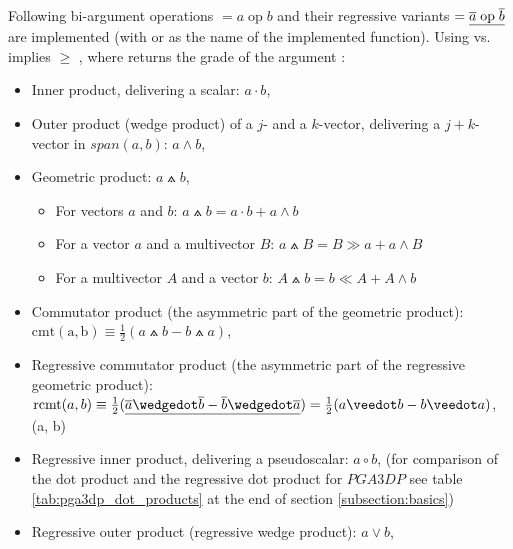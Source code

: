 Following bi-argument operations  $ =a \; \mathrm{op} \; b$ and their
regressive variants  $ = \underline{\overline{a} \; \mathrm{op} \; \overline{b}}$ are
implemented (with  or  as the name of the implemented
function). Using  vs.  implies  $\ge$ , where
 returns the grade of the argument :
\begin{itemize}
    \item Inner product, delivering a scalar: $a \cdot b$, 
    
    \item Outer product (wedge product) of a $j$- and a $k$-vector, delivering a
    $j+k$-vector in $span(a,b)$: $a \wedge b$, 
    
    \item Geometric product:  $a \wedgedot b$, 
    \begin{itemize}
        \item For vectors $a$ and $b$:  $a \wedgedot b = a \cdot b + a \wedge b$
        \item For a vector $a$ and a multivector $B$:
        $a \wedgedot B = B \gg a + a \wedge B$
                \item For a multivector $A$ and a vector $b$:
        $A \wedgedot b = b \ll A + A \wedge b$
    \end{itemize}

    \item Commutator product (the asymmetric part of the geometric product):
    $\mathrm{cmt(a, b)} \equiv \frac{1}{2}(a \wedgedot b - b \wedgedot a)$, 
    
    \item Regressive commutator product (the asymmetric part of the regressive geometric
    product): \\
    $\mathrm{rcmt}(a, b) \equiv \frac{1}{2}(\lcmpl{\rcmpl{a} \wedgedot \rcmpl{b} -
    \rcmpl{b} \wedgedot \rcmpl{a}}) = \frac{1}{2}(a \veedot b - b \veedot a)$,
    (a, b)
    
    \item Regressive inner product, delivering a pseudoscalar: $a \circ b$,  (for comparison of the dot product and the regressive dot product for $PGA3DP$ see
    table \ref{tab:pga3dp_dot_products} at the end of section \ref{subsection:basics})
    
    \item Regressive outer product (regressive wedge product): $a \vee b$,
    

\end{itemize}
